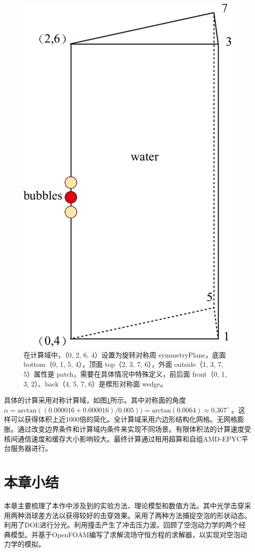 \begin{figure}[h]
\centering
\includegraphics[width=0.4\linewidth]{img/fig2.8-eps-converted-to.pdf}
\centering
\caption[计算域]{在计算域中，（0, 2,
6, 4）设置为旋转对称周 symmetryPlane，底面 bottom（0, 1, 5, 4），顶面
top（2, 3, 7, 6），外面 outside（1, 3, 7, 5）属性是
patch，需要在具体情况中特殊定义，前后面 front（0, 1, 3, 2）、back（4, 5,
7, 6）是楔形对称面 wedge。}
\label{fig2.8}
\end{figure}


具体的计算采用对称计算域，如图\ref{fig2.8}所示。其中对称面的角度
$\alpha=\mathrm{arctan} ((0.000016+0.000016)/0.005))=\mathrm{arctan} (0.0064)\approx 0.367^{\circ}$
。这样可以获得体积上近1000倍的简化。全计算域采用六边形结构化网格。无网格膨胀。通过改变边界条件和计算域内条件来实现不同场景。有限体积法的计算速度受核间通信速度和缓存大小影响较大。最终计算通过租用超算和自组AMD-EPYC平台服务器进行。

\section{本章小结}

本章主要梳理了本作中涉及到的实验方法、理论模型和数值方法。其中光学击穿采用两种消球差方法以获得较好的击穿效果。采用了两种方法捕捉空泡的形状动态。利用了DOE进行分光。利用撞击产生了冲击压力波。回顾了空泡动力学的两个经典模型。并基于OpenFOAM编写了求解流场守恒方程的求解器，以实现对空泡动力学的模拟。